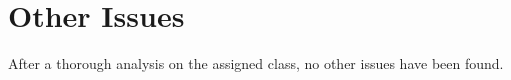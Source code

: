 \section{Other Issues}
After a thorough analysis on the assigned class, no other issues have been found.
